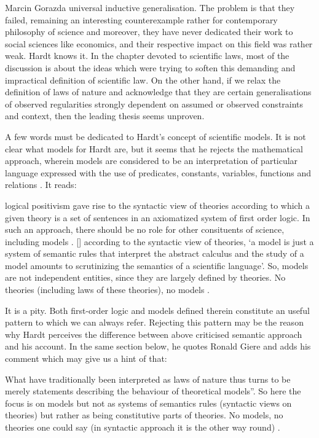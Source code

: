 \begin{recengenv}{Marcin Gorazda}
universal inductive generalisation. The problem is that they failed, remaining an interesting counterexample rather for
contemporary philosophy of science and moreover, they have never dedicated their work to social sciences like
economics, and their respective impact on this field was rather weak. Hardt knows it. In the chapter devoted to
scientific laws, most of the discussion is about the ideas which were trying to soften this demanding and impractical
definition of scientific law. On the other hand, if we relax the definition of laws of nature and acknowledge that they
are certain generalisations of observed regularities strongly dependent on assumed or observed constraints and context,
then the leading thesis seems unproven. 

A few words must be dedicated to Hardt’s concept of scientific models. It is not clear what models for Hardt are, but it
seems that he rejects the mathematical approach, wherein models are considered to be an interpretation of particular
language expressed with the use of predicates, constants, variables, functions and relations
\parencite{margaris_first_1990}.
It reads:

\begin{myquoterev}
[\mydots] logical positivism gave rise to the syntactic view of theories according to which a given theory is a set of
sentences in an axiomatized system of first order logic. In such an approach, there should be no role for other
consituents of science, including models . [\mydots] according to the syntactic view of theories, ‘a model is just a system
of semantic rules that interpret the abstract calculus and the study of a model amounts to scrutinizing the semantics
of a scientific language’. So, models are not independent entities, since they are largely defined by theories. No
theories (including laws of these theories), no models
\parencite[p.71]{hardt_economics_2017}.
\end{myquoterev}

It is a pity. Both first-order logic and models defined therein constitute an useful pattern to which we can always
refer. Rejecting this pattern may be the reason why Hardt perceives the difference between above criticised semantic
approach and his account. In the same section below, he quotes Ronald Giere and adds his comment which may give us a hint of
that:

\begin{myquoterev}
What have traditionally been interpreted as laws of nature thus turns to be merely statements describing the behaviour
of theoretical models''. So here the focus is on models but not as systems of semantics rules (syntactic views on
theories) but rather as being constitutive parts of theories. No models, no theories one could say (in syntactic
approach it is the other way round)
\parencite[p.72]{hardt_economics_2017}.
\end{myquoterev}


\end{recengenv}
